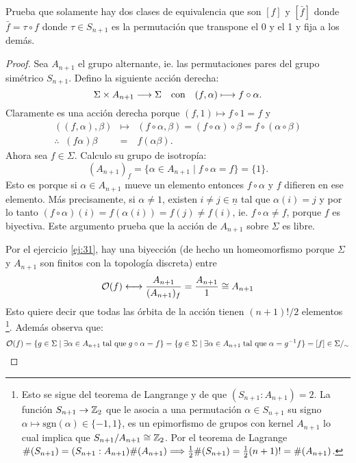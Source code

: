\begin{ejercicio}\label{ej:51}
  Prueba que solamente hay dos clases de equivalencia que son $[f]$ y $[\bar{f}]$
    donde $\bar{f}=\tau\circ f$ donde $\tau\in S_{n+1}$ es la permutaci\'on que transpone el 0
    y el 1 y fija a los dem\'as.
\end{ejercicio}
\begin{proof}%
  Sea $A_{n+1}$ el grupo alternante, ie. las permutaciones pares del grupo sim\'etrico $S_{n+1}$.
  Defino la siguiente acci\'on derecha:
  \[
    \Sigma \times A_{n+1} \longrightarrow \Sigma \quad\text{con}\quad (f,\alpha)\longmapsto f\circ\alpha.
  \]
  Claramente es una acci\'on derecha porque $(f,1)\mapsto f\circ 1=f$ y
  \begin{eqnarray*}
    ((f,\alpha),\beta)&\mapsto&(f\circ\alpha,\beta)=
    (f\circ\alpha)\circ\beta=
    f\circ(\alpha\circ\beta)\\ \therefore\;\; (f\alpha)\beta&=&f(\alpha\beta).
  \end{eqnarray*}
  Ahora sea $f\in\Sigma$. Calculo su grupo de isotrop\'ia:
  \[
    (A_{n+1})_f=\{\alpha\in A_{n+1}\mid f\circ\alpha=f\}=\{1\}.
  \]
  Esto es porque si $\alpha\in A_{n+1}$ mueve un elemento entonces $f\circ\alpha$ y $f$ difieren en
  ese elemento. M\'as precisamente, si $\alpha\neq1$, existen $i\neq j\in\underline{n}$ tal que
  $\alpha(i)=j$ y por lo tanto $(f\circ\alpha)(i)=f(\alpha(i))=f(j)\neq f(i)$, ie.
  $f\circ\alpha\neq f$, porque $f$ es biyectiva. Este argumento prueba que la acci\'on de $A_{n+1}$
  sobre $\Sigma$ es libre.

  Por el ejercicio \ref{ej:31}, hay una biyecci\'on (de hecho un homeomorfismo porque $\Sigma$ y
  $A_{n+1}$ son finitos con la topolog\'ia discreta) entre
  \[
    \mathcal{O}(f)\longleftrightarrow\frac{A_{n+1}}{(A_{n+1})_f}=\frac{A_{n+1}}{1}\cong A_{n+1} 
  \]
  Esto quiere decir que todas las \'orbita de la acci\'on tienen $(n+1)!/2$ elementos%
  \footnote{Esto se sigue del teorema de Langrange y de que $(S_{n+1}:A_{n+1})=2$. La funci\'on
    $S_{n+1}\rightarrow\mathbb{Z}_2$ que le asocia a una permutaci\'on $\alpha\in S_{n+1}$ su signo
    $\alpha\mapsto\text{sgn}(\alpha)\in\{-1,1\}$, es un epimorfismo de grupos con kernel
    $A_{n+1}$ lo cual implica que $S_{n+1}/A_{n+1}\cong\mathbb{Z}_2$. Por el teorema de Lagrange
    $\#(S_{n+1})=(S_{n+1}:A_{n+1})\#(A_{n+1})\Longrightarrow\tfrac{1}{2}\#(S_{n+1})=\tfrac{1}{2}(n+1)!=
    \#(A_{n+1})$.}. %
  Adem\'as observa que:
  \[
    \mathcal{O}(f)=
    \{g\in\Sigma\mid \exists\alpha\in A_{n+1}\;\text{tal que}\; g\circ\alpha=f\}=
    \{g\in\Sigma\mid \exists \alpha\in A_{n+1}\;\text{tal que}\; \alpha=g^{-1}f\}=
    [f]\in\Sigma/_{\sim}
  \]
  


\end{proof}

